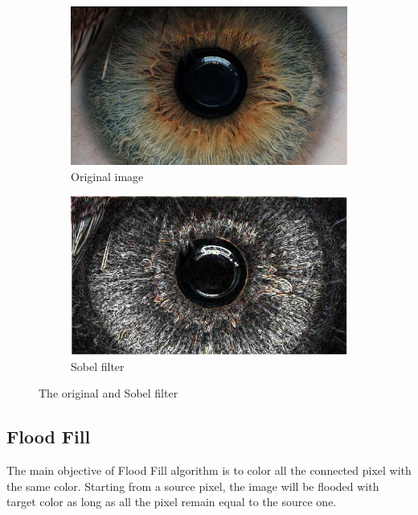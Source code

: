 \documentclass{article}
\begin{document}
%
%
\begin{figure}[H]
\centering

\begin{subfigure}{.5\textwidth}
  \centering
  \includegraphics[width=0.9\linewidth]{res/index.jpg}
  \caption{Original image}
  \label{fig:original_img}
\end{subfigure}%
\begin{subfigure}{.5\textwidth}
  \centering
  \includegraphics[width=0.9\linewidth]{res/sobel.jpg}
  \caption{Sobel filter}
  \label{fig:gray_img}
\end{subfigure}

\caption{The original and Sobel filter}
\label{fig:result_sobel}
\end{figure}




\subsection{Flood Fill}
\label{sec:flood}
The main objective of Flood Fill algorithm is to color all the connected pixel with the same color. Starting from a source pixel, the image will be flooded with target color as long as all the pixel remain equal to the source one.
\end{document}
